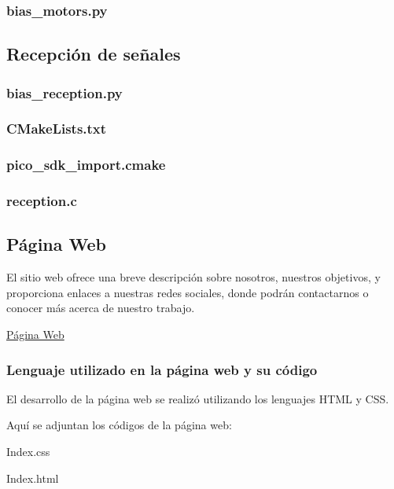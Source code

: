 \documentclass{article}
\begin{document}
\subsubsection{bias\_motors.py}


\subsection{Recepción de señales}

\subsubsection{bias\_reception.py}



\subsubsection{CMakeLists.txt}

\subsubsection{pico\_sdk\_import.cmake}

\subsubsection{reception.c}

\subsection{Página Web}
El sitio web ofrece una breve descripción sobre nosotros, nuestros objetivos, y proporciona enlaces a nuestras redes sociales, donde podrán contactarnos o conocer más acerca de nuestro trabajo.

\begin{center}
    \href{https://proyectobias.github.io/Bias/}{Página Web}
\end{center}

\subsubsection{Lenguaje utilizado en la página web y su código}
El desarrollo de la página web se realizó utilizando los lenguajes HTML y CSS.

Aquí se adjuntan los códigos de la página web:

\begin{center}
    Index.css
\end{center}



\begin{center}
    Index.html
\end{center}


\end{document}

